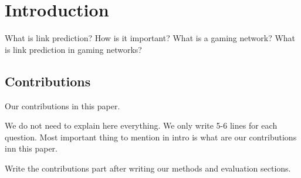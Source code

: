 \section{Introduction}
\label{sec:intro}

What is link prediction?
How is it important?
What is a gaming network?
What is link prediction in gaming networks?

\subsection{Contributions}
\label{sec:contribution}

Our contributions in this paper.

We do not need to explain here everything. We only write 5-6 lines for each
question. Most important thing to mention in intro is what are our
contributions inn this paper.

Write the contributions part after writing our methods and evaluation
sections.

